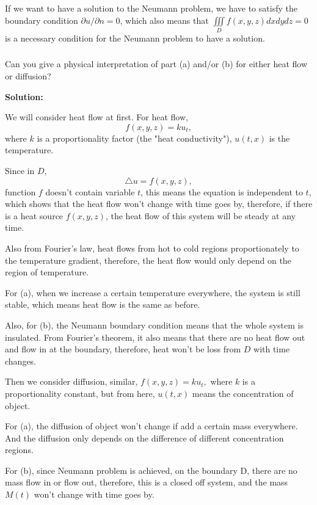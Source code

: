 \documentclass{article}
\begin{document}
			If we want to have a solution to the Neumann problem, we have to satisfy the boundary condition $\partial u /\partial n=0$, which also means that $ \iiint\limits_{D}^{} f(x,y,z)dxdydz=0$ is a necessary condition for the Neumann problem to have a solution.
		\subsubsection{}
	Can you give a physical interpretation of part (a) and/or (b) for either heat flow or diffusion?
		
	\textbf{Solution:}

	We will consider heat flow at first. For heat flow, \[f(x,y,z)=ku_{t},\]
		where $k$ is a proportionality factor (the "heat conductivity"), $u(t,x)$ is the temperature.
        
		Since in $D$, \[\triangle u = f(x,y,z),\] function $f$ doesn't contain variable $t$, this means the equation is independent to $t$, which shows that the heat flow won't change with time goes by, therefore, if there is a heat source $f(x,y,z)$, the heat flow of this system will be steady at any time. 
		
		Also from Fourier's law, heat flows from hot to cold regions proportionately to the temperature gradient, therefore, the heat flow would only depend on the region of temperature.
         
		For (a), when we increase a certain temperature everywhere, the system is still stable, which means heat flow is the same as before. 

		Also, for (b), the Neumann boundary condition means that the whole system is insulated. From Fourier's theorem, it also means that there are no heat flow out and flow in at the boundary, therefore, heat won't be loss from $D$ with time changes.

		Then we consider diffusion, similar, $f(x,y,z)=ku_{t},$ where $k$ is a proportionality constant, but from here, $u(t,x)$ means the concentration of object.
		
		For (a), the diffusion of object won't change if add a certain mass everywhere. And the diffusion only depends on the difference of different concentration regions.

		For (b), since Neumann problem is achieved, on the boundary D, there are no mass flow in or flow out, therefore, this is a closed off system, and the mass $M(t)$ won't change with time goes by.  
\end{document}
